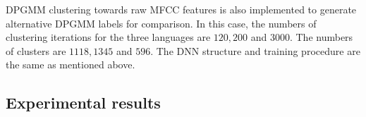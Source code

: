 \documentclass[a4paper]{article}
\begin{document}
DPGMM clustering towards raw MFCC features is also implemented to generate alternative DPGMM labels  for comparison. In this case, the numbers of clustering iterations for the three languages are $120,200$ and $3000$.
The numbers of clusters are 
$1118, 1345$ and $596$.
The DNN  structure and training procedure are the same as mentioned above.

\label{subsec:zs2017_setup}
\subsection{Experimental results}
\end{document}
